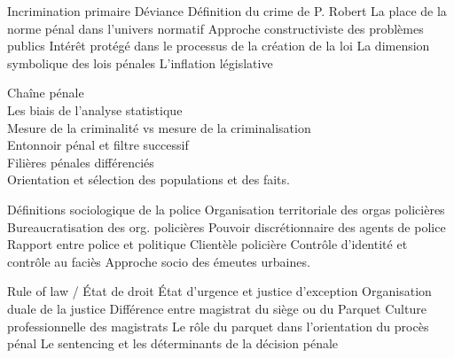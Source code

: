 \documentclass[10pt, a4paper, openany]{book}
\begin{document}
Incrimination primaire
Déviance
Définition du crime de P. Robert
La place de la norme pénal dans l'univers normatif
Approche constructiviste des problèmes publics
Intérêt protégé dans le processus de la création de la loi
La dimension symbolique des lois pénales
L'inflation législative


Chaîne pénale \\
Les biais de l'analyse statistique \\
Mesure de la criminalité vs mesure de la criminalisation \\
Entonnoir pénal et filtre successif \\
Filières pénales différenciés \\
Orientation et sélection des populations et des faits. 


Définitions sociologique de la police
Organisation territoriale des orgas policières
Bureaucratisation des org. policières
Pouvoir discrétionnaire des agents de police
Rapport entre police et politique
Clientèle policière
Contrôle d'identité et contrôle au faciès
Approche socio des émeutes urbaines. 


Rule of law / État de droit
État d'urgence et justice d'exception
Organisation duale de la justice
Différence entre magistrat du siège ou du Parquet
Culture professionnelle des magistrats
Le rôle du parquet dans l'orientation du procès pénal 
Le sentencing et les déterminants de la décision pénale
\end{document}
